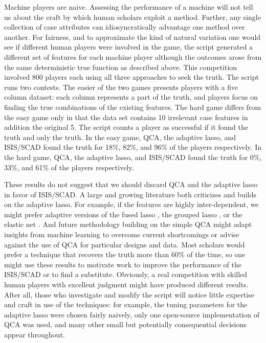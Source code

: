 \documentclass[12pt]{article}
\begin{document}
Machine players are naive. Assessing the performance of a machine will not
tell us about the craft by which human scholars exploit a method.  Further,
any single collection of case attributes can idiosyncratically advantage one
method over another. For fairness, and to approximate the kind of natural
variation one would see if different human players were involved in the game,
the script generated a different set of features for each machine player
although the outcomes arose from the same deterministic true
function as described above.  This competition involved 800 players each using
all three approaches to seek the truth.  The script runs two contests. The
easier of the two games presents players with a five column dataset: each
column represents a part of the truth, and players focus on finding the true
combinations of the existing features.  The hard game differs from the easy
game only in that the data set contains 10 irrelevant case features in
addition the original 5.  The script counts a player as successful if it found
the truth and only the truth. In the easy game, QCA, the adaptive lasso, and
ISIS/SCAD found the truth for 18\%, 82\%, and 96\% of the players
respectively. In the hard game, QCA, the adaptive lasso, and ISIS/SCAD found
the truth for 0\%, 33\%, and 61\% of the players respectively.

These results do not suggest that we should discard QCA and the adaptive lasso
in favor of ISIS/SCAD.  A large and growing literature both criticizes and
builds on the adaptive lasso. For example, if the features are highly
inter-dependent, we might prefer adaptive versions of the fused lasso
\citep{rinaldo2009properties}, the grouped lasso \citep{wang2008note}, or the
elastic net \citep{ghosh2011grouped, zou2004regression}. And future
methodology building on the simple QCA might adapt insights from machine
learning to overcome current shortcomings or advise against the use of QCA for
particular designs and data.  Most scholars would prefer a technique that
recovers the truth more than 60\% of the time, so one might use these results
to motivate work to improve the performance of the ISIS/SCAD or to find a
substitute. Obviously, a real competition with skilled human players with
excellent judgment might have produced different results.  After all, those
who investigate and modify the script will notice little expertise and craft
in use of the techniques: for example, the tuning parameters for the adaptive
lasso were chosen fairly naively, only one open-source implementation of QCA
was used, and many other small but potentially consequential decisions appear
throughout.
\end{document}
